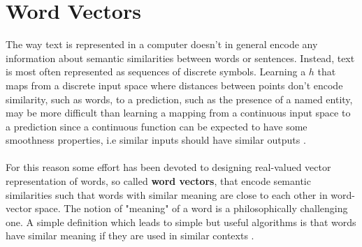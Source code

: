 \section{Word Vectors}
The way text is represented in a computer doesn't in general encode any information about semantic similarities between words or sentences. Instead, text is most often represented as sequences of discrete symbols. Learning a $h$ that maps from a discrete input space where distances between points don't encode similarity, such as words, to a prediction, such as the presence of a named entity, may be more difficult than learning a mapping from a continuous input space to a prediction since a continuous function can be expected to have some smoothness properties, i.e similar inputs should have similar outputs \citep{bengio2003}.
\\\\
For this reason some effort has been devoted to designing real-valued vector representation of words, so called \textbf{word vectors}, that encode semantic similarities such that words with similar meaning are close to each other in word-vector space. The notion of "meaning" of a word is a philosophically challenging one. A simple definition which leads to simple but useful algorithms is that words have similar meaning if they are used in similar contexts \citep{jurafsky09}.


